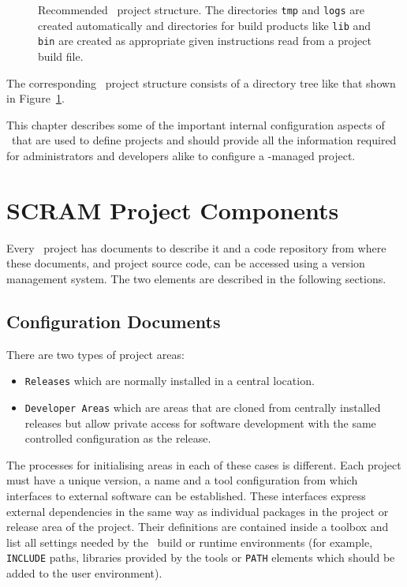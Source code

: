 \begin{figure}[htb]
  \begin{center}
    \leavevmode {}
    \caption{Recommended \scram\ project structure. The directories
      \texttt{tmp} and \texttt{logs} are created
      automatically and directories for build products 
      like \texttt{lib} and \texttt{bin} 
      are created as appropriate given instructions 
      read from a project build file.}
    \label{fig:recprojstruct} 
  \end{center}
\end{figure}

\ni The corresponding \scram\ project structure consists of a directory
tree like that shown in Figure~\ref{fig:recprojstruct}.

\ni This chapter describes some of the important internal configuration aspects of
\scram\ that are used to define projects and should provide all the
information required for administrators and developers alike to
configure a \scram-managed project.

\section{SCRAM Project Components}

Every \scram\ project has documents to describe it and a code
repository from where these documents, and project source code, can be
accessed using a version management system.
The two elements are described in the following sections.

\subsection{Configuration Documents}\label{sec:scramconfigdocs}

\ni There are two types of project areas:
\begin{itemize}
\item \texttt{Releases} which are normally installed in a central location.
\item \texttt{Developer Areas} which are areas that are cloned from
  centrally installed releases but allow private access for software 
  development with the same controlled configuration as the release.
\end{itemize}

\ni The processes for initialising areas in each of these cases is different.
Each project must have a unique version, a name and a tool
configuration from which interfaces to external software can be
established. These interfaces express external dependencies in the
same way as individual packages in the project or release area of the
project. Their definitions are contained inside a toolbox and
list all settings needed by the \scram\ build or runtime environments (for
example, \texttt{INCLUDE} paths, libraries provided by the tools or \texttt{PATH} elements
which should be added to the user environment).

